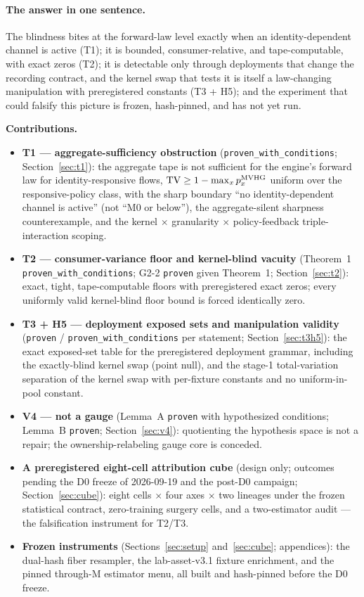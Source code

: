 \paragraph{The answer in one sentence.}
The blindness bites at the forward-law level exactly when an
identity-dependent channel is active (T1); it is bounded, consumer-relative,
and tape-computable, with exact zeros (T2); it is detectable only through
deployments that change the recording contract, and the kernel swap that
tests it is itself a law-changing manipulation with preregistered constants
(T3 + H5); and the experiment that could falsify this picture is frozen,
hash-pinned, and has not yet run.

\medskip
\noindent\textbf{Contributions.}
\begin{itemize}
\item \textbf{T1 --- aggregate-sufficiency obstruction}
(\texttt{proven\_with\_conditions}; Section~\ref{sec:t1}): the aggregate
tape is not sufficient for the engine's forward law for identity-responsive
flows, $\operatorname{TV} \ge 1 - \max_x p_x^{\operatorname{MVHG}}$ uniform over the responsive-policy
class, with the sharp boundary ``no identity-dependent channel is active''
(not ``M0 or below''), the aggregate-silent sharpness counterexample, and
the kernel $\times$ granularity $\times$ policy-feedback triple-interaction
scoping.
\item \textbf{T2 --- consumer-variance floor and kernel-blind vacuity}
(Theorem~1 \texttt{proven\_with\_conditions}; G2-2 \texttt{proven} given
Theorem~1; Section~\ref{sec:t2}): exact, tight, tape-computable floors with
preregistered exact zeros; every uniformly valid kernel-blind floor bound is
forced identically zero.
\item \textbf{T3 + H5 --- deployment exposed sets and manipulation
validity} (\texttt{proven} / \texttt{proven\_with\_conditions} per
statement; Section~\ref{sec:t3h5}): the exact exposed-set table for the
preregistered deployment grammar, including the exactly-blind kernel swap
(point null), and the stage-1 total-variation separation of the kernel swap
with per-fixture constants and no uniform-in-pool constant.
\item \textbf{V4 --- not a gauge} (Lemma~A \texttt{proven} with hypothesized
conditions; Lemma~B \texttt{proven}; Section~\ref{sec:v4}): quotienting the
hypothesis space is not a repair; the ownership-relabeling gauge core is
conceded.
\item \textbf{A preregistered eight-cell attribution cube} (design only;
outcomes pending the D0 freeze of 2026-09-19 and the post-D0 campaign;
Section~\ref{sec:cube}): eight cells $\times$ four axes $\times$ two
lineages under the frozen statistical contract, zero-training surgery cells,
and a two-estimator audit --- the falsification instrument for T2/T3.
\item \textbf{Frozen instruments} (Sections~\ref{sec:setup}
and~\ref{sec:cube}; appendices): the dual-hash fiber resampler, the
lab-asset-v3.1 fixture enrichment, and the pinned through-M estimator menu,
all built and hash-pinned before the D0 freeze.
\end{itemize}
